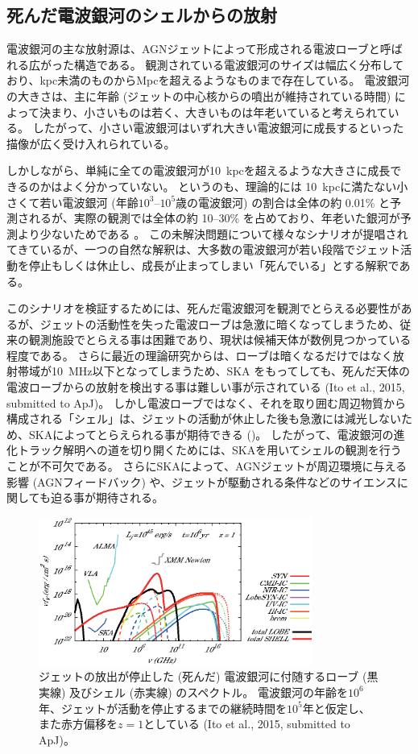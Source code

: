 \subsection{死んだ電波銀河のシェルからの放射}\label{transients.s3.agn}
電波銀河の主な放射源は、AGNジェットによって形成される電波ローブと呼ばれる広がった構造である。
観測されている電波銀河のサイズは幅広く分布しており、kpc未満のものからMpcを超えるようなものまで存在している。
電波銀河の大きさは、主に年齢 (ジェットの中心核からの噴出が維持されている時間) によって決まり、小さいものは若く、大きいものは年老いていると考えられている。
したがって、小さい電波銀河はいずれ大きい電波銀河に成長するといった描像が広く受け入れられている。

しかしながら、単純に全ての電波銀河が10~kpcを超えるような大きさに成長できるのかはよく分かっていない。
というのも、理論的には 10~kpcに満たない小さくて若い電波銀河 (年齢$10^3$--$10^5$歳の電波銀河) の割合は全体の約 0.01\% と予測されるが、実際の観測では全体の約 10--30\% を占めており、年老いた銀河が予測より少ないためである \citep{Orienti01032010,2010MNRAS.408.2261K}。
この未解決問題について様々なシナリオが提唱されてきているが、一つの自然な解釈は、大多数の電波銀河が若い段階でジェット活動を停止もしくは休止し、成長が止まってしまい「死んでいる」とする解釈である。

このシナリオを検証するためには、死んだ電波銀河を観測でとらえる必要性があるが、ジェットの活動性を失った電波ローブは急激に暗くなってしまうため、従来の観測施設でとらえる事は困難であり、現状は候補天体が数例見つかっている程度である。
さらに最近の理論研究からは、ローブは暗くなるだけではなく放射帯域が10~MHz以下となってしまうため、SKA をもってしても、死んだ天体の電波ローブからの放射を検出する事は難しい事が示されている (Ito et al., 2015, submitted to ApJ)。
しかし電波ローブではなく、それを取り囲む周辺物質から構成される「シェル」は、ジェットの活動が休止した後も急激には減光しないため、SKAによってとらえられる事が期待できる ()。
したがって、電波銀河の進化トラック解明への道を切り開くためには、SKAを用いてシェルの観測を行うことが不可欠である。
さらにSKAによって、AGNジェットが周辺環境に与える影響 (AGNフィードバック) や、ジェットが駆動される条件などのサイエンスに関しても迫る事が期待される。
\begin{figure}
		\centering
		\includegraphics[width=0.8\textwidth]{transients/transients.s3.agn.fig1.eps}
		\caption{ジェットの放出が停止した (死んだ) 電波銀河に付随するローブ (黒実線) 及びシェル (赤実線) のスペクトル。
		電波銀河の年齢を$10^6$年、ジェットが活動を停止するまでの継続時間を$10^5$年と仮定し、また赤方偏移を$z=1$としている (Ito et al., 2015, submitted to ApJ)。}
		\label{fig:transients.s3.agn.fig1}
\end{figure}%
